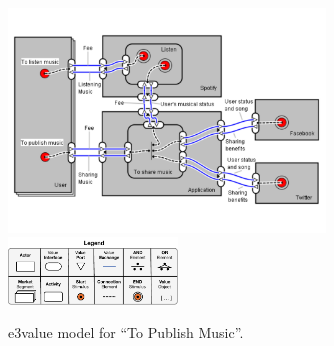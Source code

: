 \begin{figure}[htpb]
\center
\includegraphics[width=0.75\textwidth]{figs/e3value.pdf}
\hspace*{5cm}\includegraphics[width=0.4\textwidth]{figs/3ValueKey.pdf}
\caption{\label{fig:CIM:tpme3v} e3value model for ``To Publish Music''.}
\end{figure}

